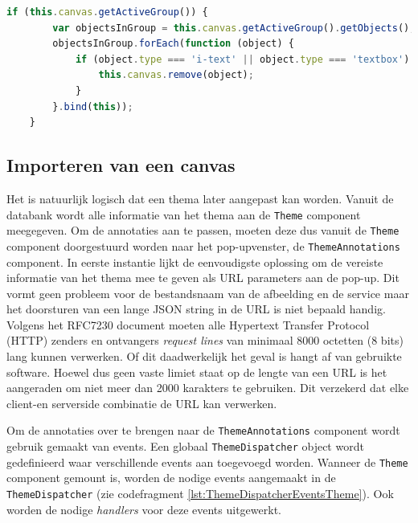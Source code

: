\begin{lstlisting}[caption={ThemeAnnotations component - delete group},label=lst:ThemeAnnotationsDeleteGroup,language=javascript]
	if (this.canvas.getActiveGroup()) {
		var objectsInGroup = this.canvas.getActiveGroup().getObjects();
		objectsInGroup.forEach(function (object) {
			if (object.type === 'i-text' || object.type === 'textbox') {
				this.canvas.remove(object);
			}
		}.bind(this));
	}
\end{lstlisting}

\subsection{Importeren van een canvas}
Het is natuurlijk logisch dat een thema later aangepast kan worden. Vanuit de databank wordt alle informatie van het thema aan de \texttt{Theme} component meegegeven. Om de annotaties aan te passen, moeten deze dus vanuit de \texttt{Theme} component doorgestuurd worden naar het pop-upvenster, de \texttt{ThemeAnnotations} component. In eerste instantie lijkt de eenvoudigste oplossing om de vereiste informatie van het thema mee te geven als URL parameters aan de pop-up. Dit vormt geen probleem voor de bestandsnaam van de afbeelding en de service maar het doorsturen van een lange JSON string in de URL is niet bepaald handig. Volgens het RFC7230 document moeten alle Hypertext Transfer Protocol (HTTP) zenders en ontvangers \textit{request lines} van minimaal 8000 octetten (8 bits) lang kunnen verwerken\cite{RFC7230}. Of dit daadwerkelijk het geval is hangt af van gebruikte software. %
Hoewel dus geen vaste limiet staat op de lengte van een URL is het aangeraden om niet meer dan 2000 karakters te gebruiken. Dit verzekerd dat elke client-en serverside combinatie de URL kan verwerken.  %

Om de annotaties over te brengen naar de \texttt{ThemeAnnotations} component wordt gebruik gemaakt van events. Een globaal \texttt{ThemeDispatcher} object wordt gedefinieerd waar verschillende events aan toegevoegd worden. Wanneer de \texttt{Theme} component gemount is, worden de nodige events aangemaakt in de \texttt{ThemeDispatcher} (zie codefragment \ref{lst:ThemeDispatcherEventsTheme}). Ook worden de nodige \textit{handlers} voor deze events uitgewerkt.

